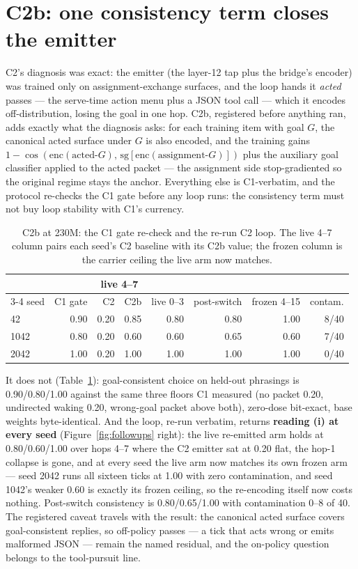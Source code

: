 \documentclass[11pt]{article}
\begin{document}
\section{C2b: one consistency term closes the emitter}

C2's diagnosis was exact: the emitter (the layer-12 tap plus the
bridge's encoder) was trained only on assignment-exchange surfaces, and
the loop hands it \emph{acted} passes --- the serve-time action menu
plus a JSON tool call --- which it encodes off-distribution, losing the
goal in one hop. C2b, registered before anything ran, adds exactly what
the diagnosis asks: for each training item with goal $G$, the canonical
acted surface under $G$ is also encoded, and the training gains
$1-\cos(\mathrm{enc}(\text{acted-}G),\,
\mathrm{sg}[\mathrm{enc}(\text{assignment-}G)])$ plus the
auxiliary goal classifier applied to the acted packet --- the
assignment side stop-gradiented so the original regime stays the
anchor. Everything else is C1-verbatim, and the protocol re-checks the
C1 gate before any loop runs: the consistency term must not buy loop
stability with C1's currency.

\begin{table}[t]
\centering
\small
\setlength{\tabcolsep}{5pt}
\begin{tabular}{lrrrrrrr}
\toprule
& & \multicolumn{2}{c}{live 4--7} & & & \\
\cmidrule(lr){3-4}
seed & C1 gate & C2 & C2b & live 0--3 & post-switch & frozen 4--15 & contam. \\
\midrule
42 & 0.90 & 0.20 & 0.85 & 0.80 & 0.80 & 1.00 & 8/40 \\
1042 & 0.80 & 0.20 & 0.60 & 0.60 & 0.65 & 0.60 & 7/40 \\
2042 & 1.00 & 0.20 & 1.00 & 1.00 & 1.00 & 1.00 & 0/40 \\
\bottomrule
\end{tabular}
\caption{C2b at 230M: the C1 gate re-check and the re-run C2 loop. The
live 4--7 column pairs each seed's C2 baseline with its C2b value; the
frozen column is the carrier ceiling the live arm now matches.}
\label{tab:c2b}
\end{table}

It does not (Table~\ref{tab:c2b}): goal-consistent choice on held-out
phrasings is 0.90/0.80/1.00 against the same three floors C1
measured (no packet 0.20, undirected waking 0.20, wrong-goal packet
above both), zero-dose bit-exact, base weights byte-identical. And the
loop, re-run verbatim, returns \textbf{reading (i) at every seed}
(Figure~\ref{fig:followups} right): the live re-emitted arm holds at
0.80/0.60/1.00 over hops 4--7 where the C2 emitter sat at 0.20
flat, the hop-1 collapse is gone, and at every seed the live arm now
matches its own frozen arm --- seed 2042 runs all sixteen ticks at
1.00 with zero contamination, and seed 1042's weaker 0.60 is exactly
its frozen ceiling, so the re-encoding itself now costs nothing.
Post-switch consistency is 0.80/0.65/1.00 with contamination
0--8 of 40. The registered
caveat travels with the result: the canonical acted surface covers
goal-consistent replies, so off-policy passes --- a tick that acts
wrong or emits malformed JSON --- remain the named residual, and the
on-policy question belongs to the tool-pursuit line.
\end{document}
